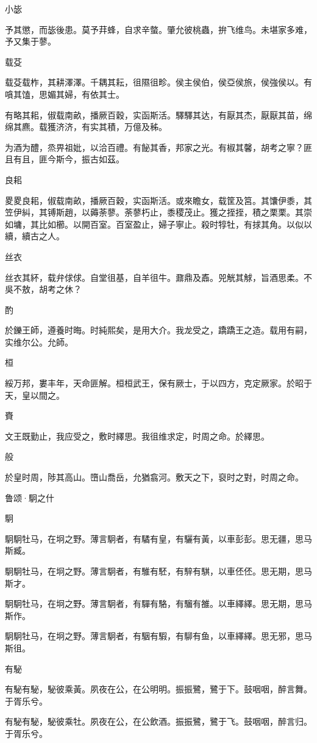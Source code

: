 小毖

予其懲，而毖後患。莫予荓蜂，自求辛螫。肇允彼桃蟲，拚飞维鸟。未堪家多难，予又集于蓼。

载芟

载芟载柞，其耕澤澤。千耦其耘，徂隰徂畛。侯主侯伯，侯亞侯旅，侯強侯以。有嗿其馌，思媚其婦，有依其士。

有略其耜，俶载南畝，播厥百穀，实函斯活。驛驛其达，有厭其杰，厭厭其苗，绵绵其麃。载獲济济，有实其積，万億及秭。

为酒为醴，烝畀祖妣，以洽百禮。有飶其香，邦家之光。有椒其馨，胡考之寧？匪且有且，匪今斯今，振古如茲。

良耜

畟畟良耜，俶载南畝，播厥百穀，实函斯活。或來瞻女，载筐及筥。其馕伊黍，其笠伊糾，其镈斯趙，以薅荼蓼。荼蓼朽止，黍稷茂止。獲之挃挃，積之栗栗。其崇如墉，其比如櫛。以開百室。百室盈止，婦子寧止。殺时犉牡，有捄其角。以似以續，續古之人。

丝衣

丝衣其紑，载弁俅俅。自堂徂基，自羊徂牛。鼐鼎及鼒。兕觥其觩，旨酒思柔。不吳不敖，胡考之休？

酌

於鑠王師，遵養时晦。时純熙矣，是用大介。我龙受之，蹻蹻王之造。载用有嗣，实维尔公。允師。

桓

綏万邦，婁丰年，天命匪解。桓桓武王，保有厥士，于以四方，克定厥家。於昭于天，皇以間之。

賚

文王既勤止，我应受之，敷时繹思。我徂维求定，时周之命。於繹思。

般

於皇时周，陟其高山。嶞山喬岳，允猶翕河。敷天之下，裒时之對，时周之命。




鲁颂·駉之什


駉

駉駉牡马，在坰之野。薄言駉者，有驈有皇，有驪有黃，以車彭彭。思无疆，思马斯臧。

駉駉牡马，在坰之野。薄言駉者，有騅有駓，有騂有騏，以車伾伾。思无期，思马斯才。

駉駉牡马，在坰之野。薄言駉者，有驒有駱，有騮有雒。以車繹繹。思无期，思马斯作。

駉駉牡马，在坰之野。薄言駉者，有駰有騢，有駠有鱼，以車繹繹。思无邪，思马斯徂。

有駜

有駜有駜，駜彼乘黃。夙夜在公，在公明明。振振鷺，鷺于下。鼓咽咽，醉言舞。于胥乐兮。

有駜有駜，駜彼乘牡。夙夜在公，在公飲酒。振振鷺，鷺于飞。鼓咽咽，醉言归。于胥乐兮。

